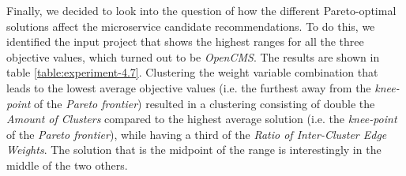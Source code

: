 \documentclass[12pt,a4paper]{report}
\begin{document}
Finally, we decided to look into the question of how the different
Pareto\hyp optimal solutions affect the microservice candidate recommendations.
To do this, we identified the input project that shows the highest ranges for
all the three objective values, which turned out to be \textit{OpenCMS}.
The results are shown in table \ref{table:experiment-4.7}.
Clustering the weight variable combination that leads to the lowest average
objective values (i.e. the furthest away from the \textit{knee\hyp point} of the
\textit{Pareto frontier}) resulted in a clustering consisting of double the
\textit{Amount of Clusters} compared to the highest average solution
(i.e. the \textit{knee\hyp point} of the \textit{Pareto frontier}),
while having a third of the \textit{Ratio of Inter\hyp Cluster Edge Weights}.
The solution that is the midpoint of the range is interestingly in the middle
of the two others.

\end{document}
